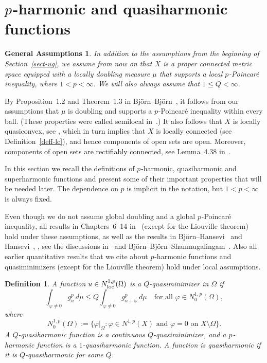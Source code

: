 \documentclass[a4paper,twoside]{article}
\theoremstyle{propositional}
\newtheorem*{ass}{General Assumptions}
\theoremstyle{descriptive}
\newtheorem{deff}[thm]{Definition}
\theoremstyle{remarkstyle}
\newcommand{\setm}{\setminus}
\newcommand{\loc}{_{\rm loc}}
\newcommand{\Om}{\Omega}
\renewcommand{\phi}{\varphi}
\newcommand{\p}{{$p\mspace{1mu}$}}
\newcommand{\Np}{N^{1,p}}
\newcommand{\Nploc}{N^{1,p}\loc}
\numberwithin{equation}{section}
\begin{document}
\section{\texorpdfstring{\p}{p}-harmonic and quasiharmonic functions}
\label{sect-harm}

\begin{ass}
In addition to the assumptions from the beginning of Section~\ref{sect-ug},
  we assume from now on that
  $X$ is a proper connected metric space
equipped with a locally doubling measure $\mu$ that
supports a local \p-Poincar\'e inequality, where $1<p<\infty$.
We will also always assume that $1 \le Q < \infty$.
\end{ass}



By Proposition~1.2 and Theorem~1.3 in
Bj\"orn--Bj\"orn~\cite{BBsemilocal},
it follows from our assumptions
that $\mu$ is doubling and supports a \p-Poincar\'e
inequality within every ball.
(These properties were  called semilocal in~\cite{BBsemilocal}.)
It also follows that $X$ is locally quasiconvex, see
\cite[Proposition~4.8]{BBsemilocal},
which in turn implies that $X$ is locally connected 
(see Definition~\ref{deff-lc}),
and hence components of open sets are open.
Moreover, components of open sets are rectifiably connected,
see Lemma~4.38 in~\cite{BBbook}.


In this section we recall the definitions of
\p-harmonic, quasiharmonic and superharmonic functions
and present some of their important properties that
will be needed later.
The dependence on $p$ is implicit in the notation,
but $1<p<\infty$ is always fixed.


Even though we do not assume global doubling and a global \p-Poincar\'e inequality,
all results
in Chapters~6--14 in~\cite{BBbook} (except for the Liouville theorem)
hold under these assumptions,
as well as the results in 
Bj\"orn--Hansevi~\cite{BHansevi1} and
Hansevi~\cite{Hansevi1}, \cite{Hansevi2}, 
see the discussions in~\cite[Section~10]{BBsemilocal}
and Bj\"orn--Bj\"orn--Shan\-mu\-ga\-lin\-gam~\cite[Remark~3.7]{BBShypend}.
Also all earlier quantitative results that we cite about
\p-harmonic functions and quasiminimizers  
(except for the Liouville theorem)
hold under local assumptions.




\begin{deff} \label{def-quasimin}
A function $u \in \Nploc(\Om)$ is a
\emph{$Q$-quasiminimizer} in $\Om$ if 
\[ 
      \int_{\phi \ne 0} g^p_u \, d\mu
           \le Q \int_{\phi \ne 0} g_{u+\phi}^p \, d\mu
           \quad \text{for all } \phi \in \Np_0(\Om),
\] 
where
\[
\Np_0(\Om):=
  \{\phi|_{\Om} : \phi \in \Np(X) \text{ and }
        \phi=0 \text{ on } X \setm \Om\}.
\]
A \emph{$Q$-quasiharmonic function} 
is a continuous $Q$-quasiminimizer,
and a \emph{\p-harmonic function} is a $1$-quasiharmonic function.
A function is \emph{quasiharmonic} if it is
$Q$-quasiharmonic for some $Q$.
\end{deff}
\end{document}
